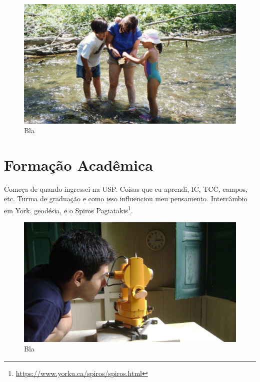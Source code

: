\documentclass[11pt,a4paper,oneside]{book}
\begin{document}
\begin{figure}[h]
  \vspace{0.5cm}
  \begin{center}
    \includegraphics[width=\textwidth]{images/1997-06-ithaca-creek.jpg}
  \end{center}
  \caption{
    Bla
  }
\end{figure}

\chapter{Formação Acadêmica}

Começa de quando ingressei na USP.
Coisas que eu aprendi, IC, TCC, campos, etc.
Turma de graduação e como isso influenciou meu pensamento.
Intercâmbio em York, geodésia, e o
Spiros Pagiatakis\footnote{\url{https://www.yorku.ca/spiros/spiros.html}}.

\begin{figure}[h]
  \vspace{0.5cm}
  \begin{center}
    \includegraphics[width=\textwidth]{images/vassouras-geomag-observation-2012.jpg}
  \end{center}
  \caption{
    Bla
  }
\end{figure}
\end{document}
